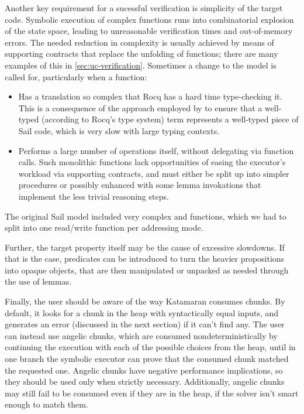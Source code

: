 Another key requirement for a sucessful verification is simplicity of the target code. Symbolic execution of complex functions runs into combinatorial explosion of the state space, leading to unreasonable verification times and out-of-memory errors. The needed reduction in complexity is usually achieved by means of supporting contracts that replace the unfolding of functions; there are many examples of this in \cref{sec:uc-verification}. Sometimes a change to the model is called for, particularly when a function:
\begin{itemize}
\item Has a \usail translation so complex that Rocq has a hard time type-checking it. This is a consequence of the approach employed by \usail to ensure that a well-typed (according to Rocq's type system) \usail term represents a well-typed piece of Sail code, which is very slow with large typing contexts.
\item Performs a large number of operations itself, without delegating via function calls. Such monolithic functions lack opportunities of easing the executor's workload via supporting contracts, and must either be split up into simpler procedures or possibly enhanced with some lemma invokations that implement the less trivial reasoning steps.
\end{itemize}
The original Sail model included very complex  and  functions, which we had to split into one read/write function per addressing mode.

Further, the target property itself may be the cause of excessive slowdowns. If that is the case, predicates can be introduced to turn the heavier propositions into opaque objects, that are then manipulated or unpacked as needed through the use of lemmas.

Finally, the user should be aware of the way Katamaran consumes chunks. By default, it looks for a chunk in the heap with syntactically equal inputs, and generates an error (discussed in the next section) if it can't find any. The user can instead use angelic chunks, which are consumed nondeterministically by continuing the execution with each of the possible choices from the heap, until in one branch the symbolic executor can prove that the consumed chunk matched the requested one. Angelic chunks have negative performance implications, so they should be used only when strictly necessary. Additionally, angelic chunks may still fail to be consumed even if they are in the heap, if the solver isn't smart enough to match them.

